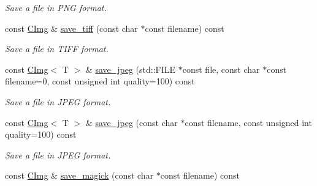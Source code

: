 \begin{DoxyCompactItemize}
\begin{DoxyCompactList}\small\item\em Save a file in P\-N\-G format. \end{DoxyCompactList}\item 
\hypertarget{structcimg__library_1_1_c_img_ac15df3e33a1ec6c37e26329f84ae0e13}{const \hyperlink{structcimg__library_1_1_c_img}{C\-Img} \& \hyperlink{structcimg__library_1_1_c_img_ac15df3e33a1ec6c37e26329f84ae0e13}{save\-\_\-tiff} (const char $\ast$const filename) const }\label{structcimg__library_1_1_c_img_ac15df3e33a1ec6c37e26329f84ae0e13}

\begin{DoxyCompactList}\small\item\em Save a file in T\-I\-F\-F format. \end{DoxyCompactList}\item 
\hypertarget{structcimg__library_1_1_c_img_aab6eba0352abb4ccfbc03bcb756d4c0b}{const \hyperlink{structcimg__library_1_1_c_img}{C\-Img}$<$ T $>$ \& \hyperlink{structcimg__library_1_1_c_img_aab6eba0352abb4ccfbc03bcb756d4c0b}{save\-\_\-jpeg} (std\-::\-F\-I\-L\-E $\ast$const file, const char $\ast$const filename=0, const unsigned int quality=100) const }\label{structcimg__library_1_1_c_img_aab6eba0352abb4ccfbc03bcb756d4c0b}

\begin{DoxyCompactList}\small\item\em Save a file in J\-P\-E\-G format. \end{DoxyCompactList}\item 
\hypertarget{structcimg__library_1_1_c_img_aed351b50d839db942c63e630525c476b}{const \hyperlink{structcimg__library_1_1_c_img}{C\-Img}$<$ T $>$ \& \hyperlink{structcimg__library_1_1_c_img_aed351b50d839db942c63e630525c476b}{save\-\_\-jpeg} (const char $\ast$const filename, const unsigned int quality=100) const }\label{structcimg__library_1_1_c_img_aed351b50d839db942c63e630525c476b}

\begin{DoxyCompactList}\small\item\em Save a file in J\-P\-E\-G format. \end{DoxyCompactList}\item 
\hypertarget{structcimg__library_1_1_c_img_a91529d80bd21a08ab9314fc132138f9c}{const \hyperlink{structcimg__library_1_1_c_img}{C\-Img} \& \hyperlink{structcimg__library_1_1_c_img_a91529d80bd21a08ab9314fc132138f9c}{save\-\_\-magick} (const char $\ast$const filename) const }\label{structcimg__library_1_1_c_img_a91529d80bd21a08ab9314fc132138f9c}


\end{DoxyCompactItemize}
